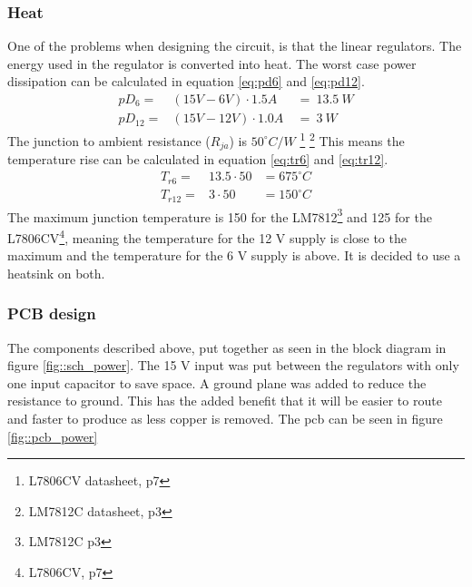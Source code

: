 \subsubsection{Heat}
One of the problems when designing the circuit, is that the linear regulators.
The energy used in the regulator is converted into heat.
The worst case power dissipation can be calculated in equation \ref{eq:pd6} and \ref{eq:pd12}.
\begin{eqnarray}
pD_{6}  =& (15V - 6V) \cdot 1.5A\ &=\ 13.5\ W \label{eq:pd6}\\
pD_{12} =& (15V - 12V)\cdot 1.0A\ &=\ 3\ W \label{eq:pd12}
\end{eqnarray}
The junction to ambient resistance ($R_{ja}$) is $50^\circ C/W$%
\footnote{L7806CV datasheet, p7}
\footnote{LM7812C datasheet, p3}
This means the temperature rise can be calculated in equation \ref{eq:tr6} and \ref{eq:tr12}.
\begin{eqnarray}
T_{r6}  =&  13.5 \cdot 50   &= 675^\circ C \label{eq:tr6}\\
T_{r12} =&  3 \cdot 50      &= 150^\circ C \label{eq:tr12}
\end{eqnarray}
The maximum junction temperature is 150 for the LM7812\footnote{LM7812C p3} and 125 for the L7806CV\footnote{L7806CV, p7}, meaning the temperature for the 12 V supply is close to the maximum and the temperature for the 6 V supply is above.
It is decided to use a heatsink on both.

\subsubsection{PCB design}
The components described above, put together as seen in the block diagram in figure \ref{fig::sch_power}. 
The 15 V input was put between the regulators with only one input capacitor to save space.
A ground plane was added to reduce the resistance to ground.
This has the added benefit that it will be easier to route and faster to produce as less copper is removed.
The pcb can be seen in figure \ref{fig::pcb_power}

